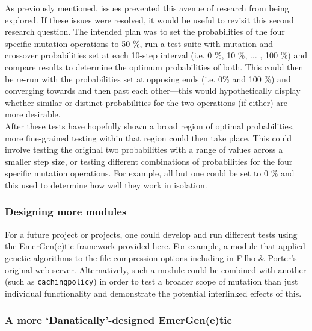 \documentclass[compsoc,12pt,a4paper]{IEEEtran}
\begin{document}
				As previously mentioned, issues prevented this avenue of research from being explored. If these issues were resolved, it would be useful to revisit this second research question. The intended plan was to set the probabilities of the four specific mutation operations to 50 \%, run a test suite with mutation and crossover probabilities set at each 10-step interval (i.e. 0 \%, 10 \%, $\dots$ , 100 \%) and compare results to determine the optimum probabilities of both. This could then be re-run with the probabilities set at opposing ends (i.e. 0\% and 100 \%) and converging towards and then past each other---this would hypothetically display whether similar or distinct probabilities for the two operations (if either) are more desirable.\\
				After these tests have hopefully shown a broad region of optimal probabilities, more fine-grained testing within that region could then take place. This could involve testing the original two probabilities with a range of values across a smaller step size, or testing different combinations of probabilities for the four specific mutation operations. For example, all but one could be set to 0 \% and this used to determine how well they work in isolation.
		
			\subsubsection{Designing more modules}
			
				For a future project or projects, one could develop and run different tests using the EmerGen(e)tic framework provided here. For example, a module that applied genetic algorithms to the file compression options including in Filho \& Porter's original web server. Alternatively, such a module could be combined with another (such as \lstinline|cachingpolicy|) in order to test a broader scope of mutation than just individual functionality and demonstrate the potential interlinked effects of this.
				
			\subsubsection{A more `Danatically'-designed EmerGen(e)tic}
			
\end{document}
